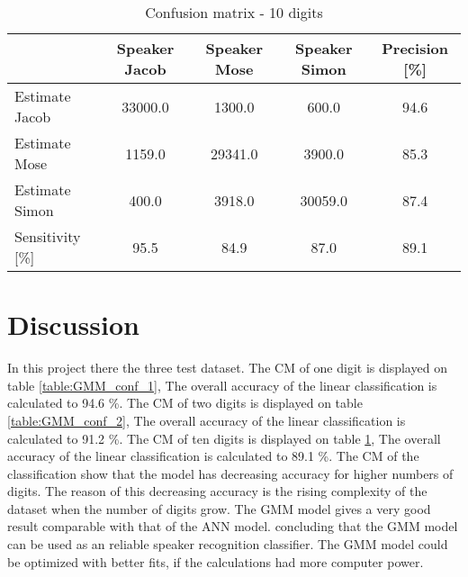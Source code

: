 \begin{table}[H]                          
\centering                                                     
\begin{tabular}{|l|c|c|c|c|}                                   
\hline                                                         
  & Speaker Jacob & Speaker Mose & Speaker Simon & Precision [\%] \\
\hline                                                         
Estimate Jacob & 33000.0 & 1300.0 & 600.0 & 94.6 \\            
\hline                                                         
Estimate Mose & 1159.0 & 29341.0 & 3900.0 & 85.3 \\            
\hline                                                         
Estimate Simon & 400.0 & 3918.0 & 30059.0 & 87.4 \\            
\hline                                                         
Sensitivity [\%] & 95.5 & 84.9 & 87.0 & 89.1 \\                
\hline                                                         
\end{tabular}                                                  
\caption{Confusion matrix - 10 digits}                         
\label{table:GMM_conf_10}                                      
\end{table}

\section{Discussion}
In this project there the three test dataset.
The CM of one digit is displayed on table \ref{table:GMM_conf_1}, The overall accuracy of the linear classification is  calculated to 94.6 \%.
The CM of two digits is displayed on table \ref{table:GMM_conf_2}, The overall accuracy of the linear classification is  calculated to 91.2 \%.
The CM of ten digits is displayed on table \ref{table:GMM_conf_10}, The overall accuracy of the linear classification is  calculated to 89.1 \%.
The CM of the classification show that the model has decreasing accuracy for higher numbers of digits.
The reason of this decreasing accuracy is the rising complexity of the dataset when the number of digits grow.
The GMM model gives a very good result comparable with that of the ANN model. 
concluding that the GMM model can be used as an reliable speaker recognition classifier.
The GMM model could be optimized with better fits, if the calculations had more computer power.













